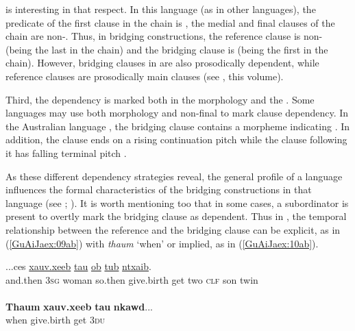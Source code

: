 \documentclass[output=paper]{LSP/langsci}
\begin{document}
 is interesting in that respect. In this language (as in other  languages), the predicate of the first clause in the chain is , the medial and final clauses of the chain are non-. Thus, in  bridging constructions, the reference clause is non- (being the last in the chain) and the bridging clause is  (being the first in the chain). However, bridging clauses in  are also prosodically dependent, while reference clauses are prosodically main clauses (see \citeauthor{sarvasy18}, this volume).

Third, the dependency is marked both in the morphology and the . Some languages may use both morphology and non-final  to mark clause dependency. In the Australian language , the bridging clause contains a morpheme indicating . In addition, the clause ends on a rising continuation pitch while the clause following it has falling terminal pitch \citep[99]{heath1985}. 

As these different dependency strategies reveal, the general profile of a language influences the formal characteristics of the bridging constructions in that language (see  \citealt{devries.2005}; \citealt[][898]{seifart10}). It is worth mentioning too that in some cases, a subordinator is present to overtly mark the bridging clause as dependent. Thus in , the temporal relationship between the reference and the bridging clause can be explicit, as in (\ref{GuAiJaex:09ab}) with \textit{thaum} `when' or implied, as in (\ref{GuAiJaex:10ab}). 


\begin{exe}
\ex \label{GuAiJaex:09ab}
\begin{xlist}
\ex \label{GuAiJaex:09a}
\gll ...ces \underline{} \underline{} \underline{} \underline{xauv.xeeb} \underline{tau} \underline{ob} \underline{} \underline{tub} \underline{ntxaib}.\\
and.then 3\textsc{sg} woman so.then give.birth get two \textsc{clf} son twin\\
\glt {}\\
\ex \label{GuAiJaex:09b}
\gll \textbf{Thaum} \textbf{xauv.xeeb} \textbf{tau} \textbf{nkawd}...\\     	      
    when  give.birth get 3\textsc{du}\\
\glt {} 
\end{xlist}
\end{exe}
\end{document}
